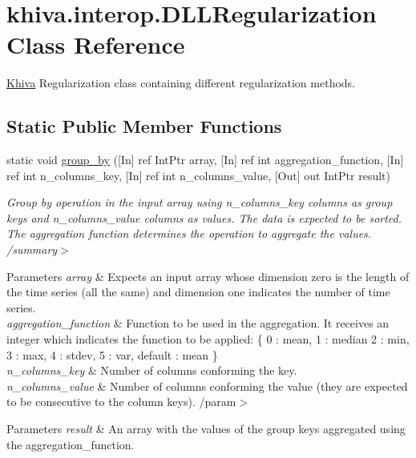 \hypertarget{classkhiva_1_1interop_1_1_d_l_l_regularization}{}\section{khiva.\+interop.\+D\+L\+L\+Regularization Class Reference}
\label{classkhiva_1_1interop_1_1_d_l_l_regularization}


\mbox{\hyperlink{classkhiva_1_1_khiva}{Khiva}} Regularization class containing different regularization methods.  


\subsection*{Static Public Member Functions}
\begin{DoxyCompactItemize}
\item 
static void \mbox{\hyperlink{classkhiva_1_1interop_1_1_d_l_l_regularization_a10e0bd8ee9417e34f6e40027bc3e3f38}{group\+\_\+by}} (\mbox{[}In\mbox{]} ref Int\+Ptr array, \mbox{[}In\mbox{]} ref int aggregation\+\_\+function, \mbox{[}In\mbox{]} ref int n\+\_\+columns\+\_\+key, \mbox{[}In\mbox{]} ref int n\+\_\+columns\+\_\+value, \mbox{[}Out\mbox{]} out Int\+Ptr result)
\begin{DoxyCompactList}\small\item\em Group by operation in the input array using n\+\_\+columns\+\_\+key columns as group keys and n\+\_\+columns\+\_\+value columns as values. The data is expected to be sorted. The aggregation function determines the operation to aggregate the values. /summary$>$ 
\begin{DoxyParams}{Parameters}
{\em array} & Expects an input array whose dimension zero is the length of the time series (all the same) and dimension one indicates the number of time series.\\
\hline
{\em aggregation\+\_\+function} & Function to be used in the aggregation. It receives an integer which indicates the function to be applied\+: \{ 0 \+: mean, 1 \+: median 2 \+: min, 3 \+: max, 4 \+: stdev, 5 \+: var, default \+: mean \}\\
\hline
{\em n\+\_\+columns\+\_\+key} & Number of columns conforming the key.\\
\hline
{\em n\+\_\+columns\+\_\+value} & Number of columns conforming the value (they are expected to be consecutive to the column keys). /param$>$ 
\begin{DoxyParams}{Parameters}
{\em result} & An array with the values of the group keys aggregated using the aggregation\+\_\+function.\\
\hline
\end{DoxyParams}
\\
\hline
\end{DoxyParams}
\end{DoxyCompactList}\end{DoxyCompactItemize}


